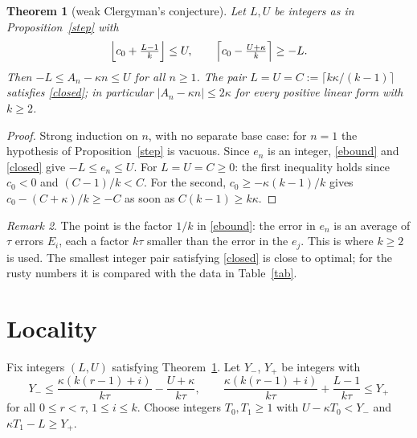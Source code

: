 \documentclass[11pt]{article}
\newtheorem{theorem}{Theorem}\newtheorem{lemma}[theorem]{Lemma}\newtheorem{proposition}[theorem]{Proposition}\newtheorem{corollary}[theorem]{Corollary}
\theoremstyle{remark}\newtheorem{remark}[theorem]{Remark}
\theoremstyle{definition}\newtheorem{definition}[theorem]{Definition}
\begin{document}
\begin{theorem}[weak Clergyman's conjecture]\label{bounded}
Let \(L,U\) be integers as in Proposition~\ref{step} with
\begin{equation}\label{closed}
\Bigl\lfloor c_0+\tfrac{L-1}{k}\Bigr\rfloor\le U,\qquad \Bigl\lceil c_0-\tfrac{U+\kappa}{k}\Bigr\rceil\ge -L .
\end{equation}
Then \(-L\le A_n-\kappa n\le U\) for all \(n\ge1\). The pair \(L=U=C:=\lceil k\kappa/(k-1)\rceil\) satisfies \eqref{closed}; in particular \(|A_n-\kappa n|\le 2\kappa\) for every positive linear form with \(k\ge2\).
\end{theorem}
\begin{proof}
Strong induction on \(n\), with no separate base case: for \(n=1\) the hypothesis of Proposition~\ref{step} is vacuous. Since \(e_n\) is an integer, \eqref{ebound} and \eqref{closed} give \(-L\le e_n\le U\).
For \(L=U=C\ge0\): the first inequality holds since \(c_0<0\) and \((C-1)/k<C\). For the second, \(c_0\ge-\kappa(k-1)/k\) gives \(c_0-(C+\kappa)/k\ge -C\) as soon as \(C(k-1)\ge k\kappa\).
\end{proof}

\begin{remark}
The point is the factor \(1/k\) in \eqref{ebound}: the error in \(e_n\) is an average of \(\tau\) errors \(E_i\), each a factor \(k\tau\) smaller than the error in the \(e_j\). This is where \(k\ge2\) is used. The smallest integer pair satisfying \eqref{closed} is close to optimal; for the rusty numbers it is compared with the data in Table~\ref{tab}.
\end{remark}

\section{Locality}
Fix integers \((L,U)\) satisfying Theorem~\ref{bounded}. Let \(Y_-\), \(Y_+\) be integers with
\[Y_-\le \frac{\kappa(k(r-1)+i)}{k\tau}-\frac{U+\kappa}{k\tau},\qquad \frac{\kappa(k(r-1)+i)}{k\tau}+\frac{L-1}{k\tau}\le Y_+\]
for all \(0\le r<\tau\), \(1\le i\le k\). Choose integers \(T_0,T_1\ge1\) with \(U-\kappa T_0<Y_-\) and \(\kappa T_1-L\ge Y_+\).
\end{document}
